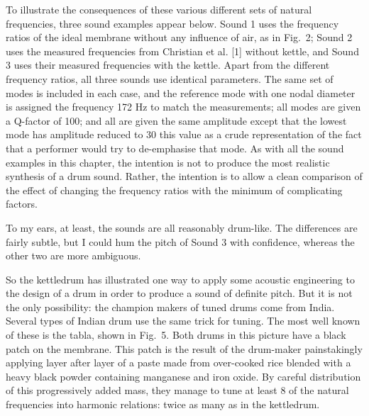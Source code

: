 
  To illustrate the consequences of these various different sets of natural 
  frequencies, three sound examples appear below. Sound 1 uses the frequency 
  ratios of the ideal membrane without any influence of air, as in Fig.\ 2; 
  Sound 2 uses the measured frequencies from Christian et al. [1] without 
  kettle, and Sound 3 uses their measured frequencies with the kettle. Apart 
  from the different frequency ratios, all three sounds use identical 
  parameters. The same set of modes is included in each case, and the reference 
  mode with one nodal diameter is assigned the frequency 172 Hz to match the 
  measurements; all modes are given a Q-factor of 100; and all are given the 
  same amplitude except that the lowest mode has amplitude reduced to 30%
  this value as a crude representation of the fact that a performer would try 
  to de-emphasise that mode. As with all the sound examples in this chapter, 
  the intention is not to produce the most realistic synthesis of a drum sound. 
  Rather, the intention is to allow a clean comparison of the effect of 
  changing the frequency ratios with the minimum of complicating factors. 

  To my ears, at least, the sounds are all reasonably drum-like. The 
  differences are fairly subtle, but I could hum the pitch of Sound 3 with 
  confidence, whereas the other two are more ambiguous. 

  So the kettledrum has illustrated one way to apply some acoustic engineering 
  to the design of a drum in order to produce a sound of definite pitch. But it 
  is not the only possibility: the champion makers of tuned drums come from 
  India. Several types of Indian drum use the same trick for tuning. The most 
  well known of these is the tabla, shown in Fig.\ 5. Both drums in this 
  picture have a black patch on the membrane. This patch is the result of the 
  drum-maker painstakingly applying layer after layer of a paste made from 
  over-cooked rice blended with a heavy black powder containing manganese and 
  iron oxide. By careful distribution of this progressively added mass, they 
  manage to tune at least 8 of the natural frequencies into harmonic relations: 
  twice as many as in the kettledrum. 

